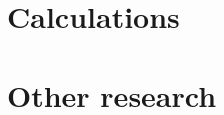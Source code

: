 \documentclass[letterpaper,oneside,english,11pt,openany]{memoir}
\begin{document}


\clearpage

\appendix

\chapter{Calculations}



\chapter{Other research}%
\label{cha:robstat}



\clearpage

\backmatter

\pagestyle{plain}

\printbibliography

\clearpage

\printindex
\end{document}
